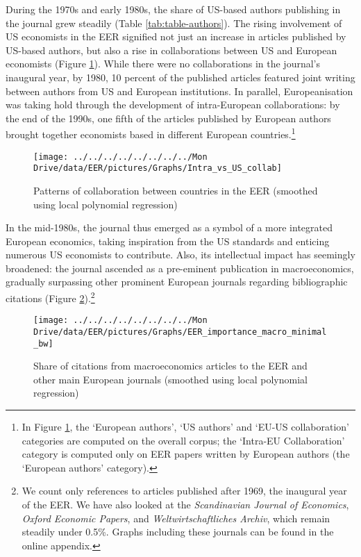 \documentclass[
  12pt,
  onecolumn]{article}
\begin{document}
During the 1970s and early 1980s, the share of US-based authors publishing in the journal grew steadily (Table \ref{tab:table-authors}). The rising involvement of US economists in the EER signified not just an increase in articles published by US-based authors, but also a rise in collaborations between US and European economists (Figure \ref{fig:plot-collabs}). While there were no collaborations in the journal's inaugural year, by 1980, 10 percent of the published articles featured joint writing between authors from US and European institutions. In parallel, Europeanisation was taking hold through the development of intra-European collaborations: by the end of the 1990s, one fifth of the articles published by European authors brought together economists based in different European countries.\footnote{In Figure \ref{fig:plot-collabs}, the `European authors', `US authors' and `EU-US collaboration' categories are computed on the overall corpus; the `Intra-EU Collaboration' category is computed only on EER papers written by European authors (the `European authors' category).}

\begin{figure}[H]

{\centering \texttt{[image: ../../../../../../../../Mon Drive/data/EER/pictures/Graphs/Intra\_vs\_US\_collab]} 

}

\caption{Patterns of collaboration between countries in the EER (smoothed using local polynomial regression)\protect\footnotemark}\label{fig:plot-collabs}
\end{figure}

In the mid-1980s, the journal thus emerged as a symbol of a more integrated European economics, taking inspiration from the US standards and enticing numerous US economists to contribute. Also, its intellectual impact has seemingly broadened: the journal ascended as a pre-eminent publication in macroeconomics, gradually surpassing other prominent European journals regarding bibliographic citations (Figure \ref{fig:plot-eer-importance-macro}).\footnote{We count only references to articles published after 1969, the inaugural year of the EER. We have also looked at the \textit{Scandinavian Journal of Economics}, \textit{Oxford Economic Papers}, and \textit{Weltwirtschaftliches Archiv}, which remain steadily under 0.5\%. Graphs including these journals can be found in the online appendix.}

\begin{figure}[H]

{\centering \texttt{[image: ../../../../../../../../Mon Drive/data/EER/pictures/Graphs/EER\_importance\_macro\_minimal\_bw]} 

}

\caption{Share of citations from macroeconomics articles to the EER and other main European journals (smoothed using local polynomial regression)\protect\footnotemark}\label{fig:plot-eer-importance-macro}
\end{figure}
\end{document}
